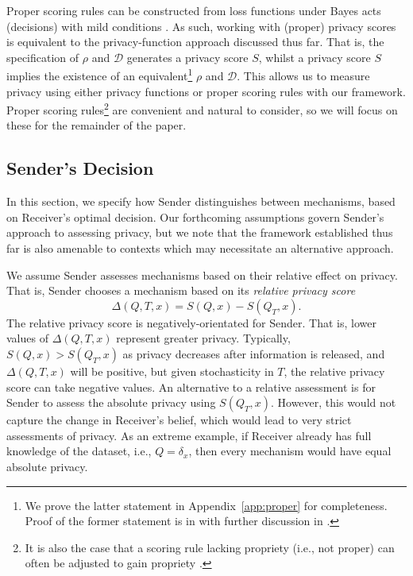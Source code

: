 \documentclass{article}
\theoremstyle{plain}
\theoremstyle{plain}
\theoremstyle{definition}
\theoremstyle{remark}
\theoremstyle{plain}
\newcommand{\dset}{\mathcal{D}}
\begin{document}
Proper scoring rules can be constructed from loss functions under Bayes acts (decisions) with mild conditions \citep{grunwald2004game}.
As such, working with (proper) privacy scores is equivalent to the privacy-function approach discussed thus far. That is, the specification of $\rho$ and $\dset$ generates a privacy score $S$, whilst a privacy score $S$ implies the existence of an equivalent\footnote{We prove the latter statement in Appendix~\ref{app:proper} for completeness. Proof of the former statement is in \citet{grunwald2004game} with further discussion in \citet{brehmer2020properization}.} $\rho$ and $\dset$. 
This allows us to measure privacy using either privacy functions or proper scoring rules with our framework. Proper scoring rules\footnote{It is also the case that a scoring rule lacking propriety (i.e., not proper) can often be adjusted to gain propriety \citep{brehmer2020properization}.} are convenient and natural to consider, so we will focus on these for the remainder of the paper. 

\subsection{Sender's Decision}\label{sec:sender}
In this section, we specify how Sender distinguishes between mechanisms, based on Receiver's optimal decision. Our forthcoming assumptions govern Sender's approach to assessing privacy, but we note that the framework established thus far is also amenable to contexts which may necessitate an alternative approach.

We assume Sender assesses mechanisms based on their relative effect on privacy. That is, Sender chooses a mechanism based on its \textit{relative privacy score}
\begin{equation*}
    \Delta(Q,T,x) = S(Q,x) - S(Q_T,x).
\end{equation*}
The relative privacy score is negatively-orientated for Sender. That is, lower values of $\Delta(Q,T,x)$ represent greater privacy. Typically, $S(Q,x) > S(Q_T,x)$ as privacy decreases after information is released, and $\Delta(Q,T,x)$ will be positive, but given stochasticity in $T$, the relative privacy score can take negative values.
An alternative to a relative assessment is for Sender to assess the absolute privacy using $S(Q_T,x)$. However, this would not capture the change in Receiver's belief, which would lead to very strict assessments of privacy. As an extreme example, if Receiver already has full knowledge of the dataset, i.e., $Q=\delta_x$, then every mechanism would have equal absolute privacy.
\end{document}
